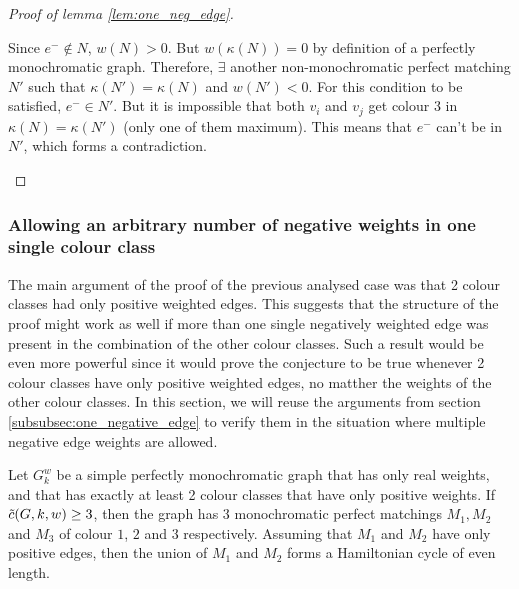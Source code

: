\begin{proof}[Proof of lemma \ref{lem:one_neg_edge}]
\begin{enumerate}
\begin{enumerate}
            Since $e^- \notin N$, $w(N) > 0$. But $w(\kappa(N)) = 0$ by definition of a perfectly monochromatic graph. Therefore, $\exists$ another non-monochromatic perfect matching $N'$ such that $\kappa(N') = \kappa(N)$ and $w(N') < 0$. For this condition to be satisfied, $e^- \in N'$. But it is impossible that both $v_i$ and $v_j$ get colour $3$ in $\kappa(N) = \kappa(N')$ (only one of them maximum). This means that $e^-$ can't be in $N'$, which forms a contradiction.
        \end{enumerate}
    \end{enumerate}

\end{proof}

\subsubsection{Allowing an arbitrary number of negative weights in one single colour class}

The main argument of the proof of the previous analysed case was that 2 colour classes had only positive weighted edges. This suggests that the structure of the proof might work as well if more than one single negatively weighted edge was present in the combination of the other colour classes. Such a result would be even more powerful since it would prove the conjecture to be true whenever 2 colour classes have only positive weighted edges, no matther the weights of the other colour classes. In this section, we will reuse the arguments from section \ref{subsubsec:one_negative_edge} to verify them in the situation where multiple negative edge weights are allowed.

\begin{observation}
    \label{obs:2_positive_classes_ham_cycle}
    Let $G_k^w$ be a simple perfectly monochromatic graph that has only real weights, and that has exactly at least 2 colour classes that have only positive weights. If $\Tilde{c}(G, k, w) \geq 3$, then the graph has $3$ monochromatic perfect matchings $M_1, M_2$ and $M_3$ of colour $1$, $2$ and $3$ respectively. Assuming that $M_1$ and $M_2$ have only positive edges, then the union of $M_1$ and $M_2$ forms a Hamiltonian cycle of even length.
\end{observation}


